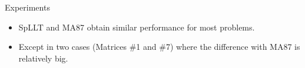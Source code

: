 \documentclass[unknownkeysallowed]{beamer}
\newcommand{\dr}[1]{\textcolor{mred}{#1\xspace}}
\newcommand{\dd}[1]{\textcolor{gray!70}{#1\xspace}}
\begin{document}
\begin{frame}{Experiments}
\begin{center}
  \end{center}
  
  \begin{itemize}
  \item SpLLT and MA87 obtain similar performance for most problems.
  \item Except in two cases (Matrices \#1 and \#7) where the
    difference with MA87 is relatively big.
  \end{itemize}
\end{frame}
\end{document}
